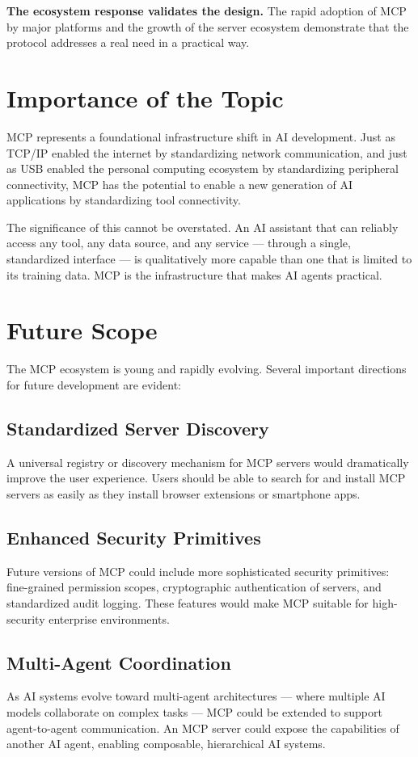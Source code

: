 \textbf{The ecosystem response validates the design.} The rapid adoption of MCP by major platforms and the growth of the server ecosystem demonstrate that the protocol addresses a real need in a practical way.

\section{Importance of the Topic}
MCP represents a foundational infrastructure shift in AI development. Just as TCP/IP enabled the internet by standardizing network communication, and just as USB enabled the personal computing ecosystem by standardizing peripheral connectivity, MCP has the potential to enable a new generation of AI applications by standardizing tool connectivity.

The significance of this cannot be overstated. An AI assistant that can reliably access any tool, any data source, and any service — through a single, standardized interface — is qualitatively more capable than one that is limited to its training data. MCP is the infrastructure that makes AI agents practical.

\section{Future Scope}
The MCP ecosystem is young and rapidly evolving. Several important directions for future development are evident:

\subsection{Standardized Server Discovery}
A universal registry or discovery mechanism for MCP servers would dramatically improve the user experience. Users should be able to search for and install MCP servers as easily as they install browser extensions or smartphone apps.

\subsection{Enhanced Security Primitives}
Future versions of MCP could include more sophisticated security primitives: fine-grained permission scopes, cryptographic authentication of servers, and standardized audit logging. These features would make MCP suitable for high-security enterprise environments.

\subsection{Multi-Agent Coordination}
As AI systems evolve toward multi-agent architectures — where multiple AI models collaborate on complex tasks — MCP could be extended to support agent-to-agent communication. An MCP server could expose the capabilities of another AI agent, enabling composable, hierarchical AI systems.

